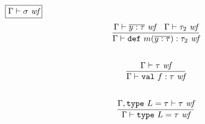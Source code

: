 \documentclass{article}
\newcommand{\keywadj}[1]{\mathtt{#1}}
\newcommand{\keyw}[1]{\keywadj{#1}~}
\begin{document}
$\fbox{$\Gamma \vdash \sigma~\textit{wf}$}$
\[
\begin{array}{c}
\infer
  {\Gamma \vdash \keyw{def} m(\overline{y : \tau}) : \tau_2~\textit{wf}}
  {\Gamma \vdash \overline{y : \tau}~\textit{wf} & \Gamma \vdash \tau_2~\textit{wf}}\\[5ex]

\infer
  {\Gamma \vdash \keyw{val} f : \tau~\textit{wf}}
  {\Gamma \vdash \tau~\textit{wf}}\\[5ex]

\infer
  {\Gamma \vdash \keyw{type} L = \tau~\textit{wf}}
  {\Gamma, \keyw{type} L = \tau \vdash \tau~\textit{wf}}\\[5ex]


\end{array}
\]



\end{document}
